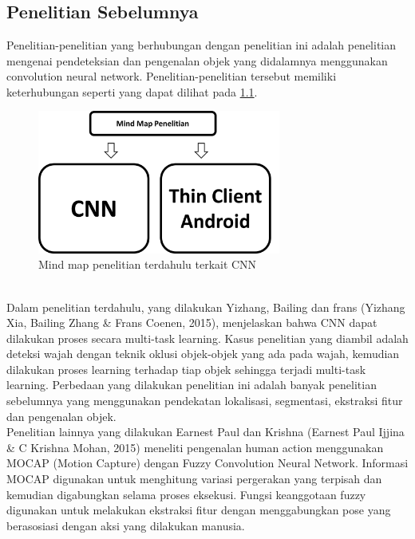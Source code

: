 \chapter{\babDua}
\section{Penelitian Sebelumnya}
Penelitian-penelitian yang berhubungan dengan penelitian ini adalah penelitian mengenai pendeteksian dan pengenalan objek yang didalamnya menggunakan convolution neural network. Penelitian-penelitian tersebut memiliki keterhubungan seperti yang dapat dilihat pada \ref{fig:mind_map}.\\
\begin{figure}[htp]
	\centering
	\includegraphics[width=8cm]{pics/mind_map_final}
	\caption{Mind map penelitian terdahulu terkait CNN}
	\label{fig:mind_map}
\end{figure}\\
Dalam penelitian terdahulu, yang dilakukan Yizhang, Bailing dan frans (Yizhang Xia, Bailing Zhang \& Frans Coenen, 2015), menjelaskan bahwa CNN dapat dilakukan proses secara multi-task learning. Kasus penelitian yang diambil adalah deteksi wajah dengan teknik oklusi objek-objek yang ada pada wajah, kemudian dilakukan proses learning terhadap tiap objek sehingga terjadi multi-task learning. Perbedaan yang dilakukan penelitian ini adalah banyak penelitian sebelumnya yang menggunakan pendekatan lokalisasi, segmentasi, ekstraksi fitur dan pengenalan objek. \\
Penelitian lainnya yang dilakukan Earnest Paul dan Krishna (Earnest Paul Ijjina \& C Krishna Mohan, 2015) meneliti pengenalan human action menggunakan MOCAP (Motion Capture) dengan Fuzzy Convolution Neural Network. Informasi MOCAP digunakan untuk menghitung variasi pergerakan yang terpisah dan kemudian digabungkan selama proses eksekusi. Fungsi keanggotaan fuzzy digunakan untuk melakukan ekstraksi fitur dengan menggabungkan pose yang berasosiasi dengan aksi yang dilakukan manusia.\\
